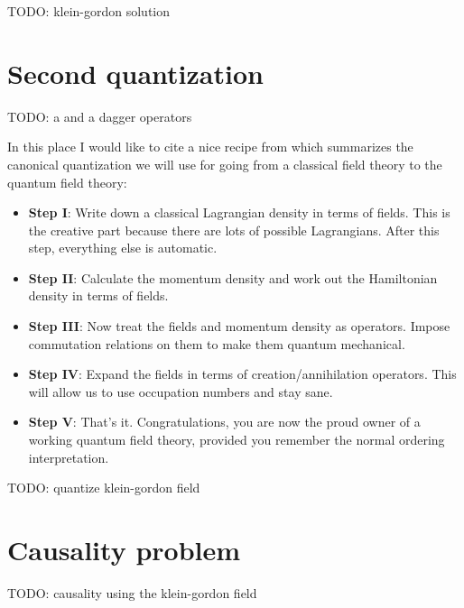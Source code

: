 TODO: klein-gordon solution

\section{Second quantization}

TODO: a and a dagger operators

In this place I would like to cite a nice recipe from \cite{gifted_amateur} which summarizes
the canonical quantization we will use for going from a classical field theory to the quantum 
field theory:

\begin{itemize}
    \item \textbf{Step I}: Write down a classical Lagrangian density in terms of fields. This is the creative part because there are lots of 
        possible Lagrangians. After this step, everything else is automatic.
    \item \textbf{Step II}: Calculate the momentum density and work out the Hamiltonian density in terms of fields.
    \item \textbf{Step III}: Now treat the fields and momentum density as operators. Impose commutation relations on them to make them 
        quantum mechanical.
    \item \textbf{Step IV}: Expand the fields in terms of creation/annihilation operators. This will allow us to use occupation numbers 
        and stay sane.
    \item \textbf{Step V}: That's it. Congratulations, you are now the proud owner of a working quantum field theory, provided you remember 
        the normal ordering interpretation.
\end{itemize}

TODO: quantize klein-gordon field

\section{Causality problem}

TODO: causality using the klein-gordon field
